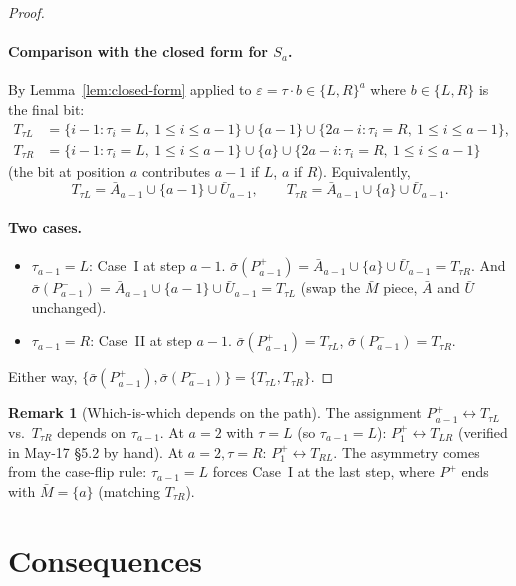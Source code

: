 \documentclass[11pt]{article}
\theoremstyle{definition}
\newtheorem{remark}[theorem]{Remark}
\begin{document}
\begin{proof}
\paragraph{Comparison with the closed form for $S_a$.}  By
Lemma~\ref{lem:closed-form} applied to $\varepsilon=\tau\cdot b\in
\{L,R\}^a$ where $b\in\{L,R\}$ is the final bit:
\begin{align*}
   T_{\tau L} & =\{i-1 : \tau_i=L,\ 1\le i\le a-1\}\cup\{a-1\}
   \cup\{2a-i : \tau_i=R,\ 1\le i\le a-1\}, \\
   T_{\tau R} & =\{i-1 : \tau_i=L,\ 1\le i\le a-1\}\cup\{a\}
   \cup\{2a-i : \tau_i=R,\ 1\le i\le a-1\}
\end{align*}
(the bit at position $a$ contributes $a-1$ if $L$, $a$ if $R$).
Equivalently,
\[
   T_{\tau L}=\bar A_{a-1}\cup\{a-1\}\cup\bar U_{a-1},\qquad
   T_{\tau R}=\bar A_{a-1}\cup\{a\}\cup\bar U_{a-1}.
\]

\paragraph{Two cases.}
\begin{itemize}[leftmargin=2em,topsep=0.3em,itemsep=0.2em]
\item $\tau_{a-1}=L$: Case~I at step $a-1$.
  $\bar\sigma(P_{a-1}^+)=\bar A_{a-1}\cup\{a\}\cup\bar U_{a-1}=T_{\tau R}$.
  And $\bar\sigma(P_{a-1}^-)=\bar A_{a-1}\cup\{a-1\}\cup\bar U_{a-1}=T_{\tau L}$
  (swap the $\bar M$ piece, $\bar A$ and $\bar U$ unchanged).
\item $\tau_{a-1}=R$: Case~II at step $a-1$.
  $\bar\sigma(P_{a-1}^+)=T_{\tau L}$, $\bar\sigma(P_{a-1}^-)=T_{\tau R}$.
\end{itemize}
Either way, $\{\bar\sigma(P_{a-1}^+),\bar\sigma(P_{a-1}^-)\}
=\{T_{\tau L},T_{\tau R}\}$.
\end{proof}

\begin{remark}[Which-is-which depends on the path]
The assignment $P_{a-1}^+\leftrightarrow T_{\tau L}$ vs.\ $T_{\tau R}$
depends on $\tau_{a-1}$.  At $a=2$ with $\tau=L$ (so $\tau_{a-1}=L$):
$P_1^+\leftrightarrow T_{LR}$ (verified in May-17 \S5.2 by hand).
At $a=2,\tau=R$: $P_1^+\leftrightarrow T_{RL}$.  The asymmetry comes
from the case-flip rule: $\tau_{a-1}=L$ forces Case~I at the last
step, where $P^+$ ends with $\bar M=\{a\}$ (matching $T_{\tau R}$).
\end{remark}

\section{Consequences}\label{sec:consequences}
\end{document}
